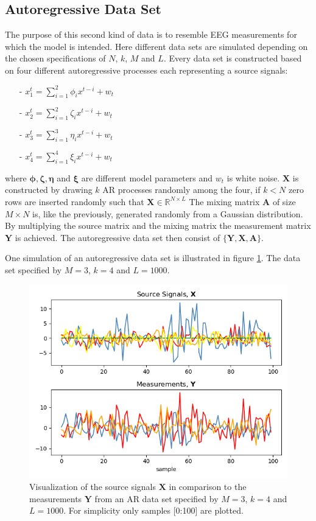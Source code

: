 \subsection{Autoregressive Data Set}
The purpose of this second kind of data is to resemble EEG measurements for which the model is intended. Here different data sets are simulated depending on the chosen specifications of $N$, $k$, $M$ and $L$. 
Every data set is constructed based on four different autoregressive processes each representing a source signals:
\begin{itemize}
\item[-] $x_{1}^{t} = \sum_{i=1}^{2} \phi_i x^{t-i} + w_t$
\item[-] $x_{2}^{t} = \sum_{i=1}^{2} \zeta_i x^{t-i} + w_t$
\item[-] $x_{3}^{t} = \sum_{i=1}^{3} \eta_i x^{t-i} + w_t$
\item[-] $x_{4}^{t} = \sum_{i=1}^{4} \xi_i x^{t-i} + w_t$
\end{itemize}
where $\boldsymbol{\phi},\boldsymbol{\zeta},\boldsymbol{\eta}$ and $\boldsymbol{\xi}$ are different model parameters and $w_t$ is white noise.
$\textbf{X}$ is constructed by drawing $k$ AR processes randomly among the four, if $k<N$ zero rows are inserted randomly such that $\textbf{X}\in \mathbb{R}^{N \times L}$  
The mixing matrix $\mathbf{A}$ of size $M \times N$ is, like the previously, generated randomly from a Gaussian distribution.
By multiplying the source matrix and the mixing matrix the measurement matrix $\mathbf{Y}$ is achieved.
The autoregressive data set then consist of $\{ \mathbf{Y}, \mathbf{X}, \mathbf{A} \}$. 

One simulation of an autoregressive data set is illustrated in figure \ref{fig:AR}. The data set specified by $M = 3$, $k = 4$ and $L = 1000$.
\begin{figure}[H]
\centering
\includegraphics[scale=0.5]{figures/ch_6/AR_data.png}
\caption{Visualization of the source signals $\textbf{X}$ in comparison to the measurements $\mathbf{Y}$ from an AR data set specified by $M = 3$, $k=4$ and $L=1000$. For simplicity only samples [0:100] are plotted.}
\label{fig:AR}
\end{figure}
\noindent

